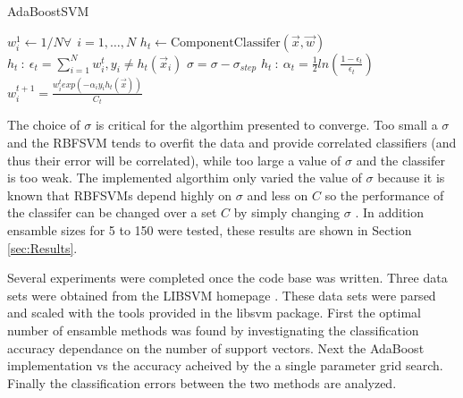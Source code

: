 \begin{algorithm}
\caption{AdaBoostSVM}
\label{algo:AdaBoostSVM}
\begin{algorithmic}[1]
\State $w_{i}^{1} \gets 1/N \forall ~~ i=1,\dots,N$
    \label{marker}
    \State $h_t \gets \text{ComponentClassifer}(\vec{x},\vec{w})$
    \State $h_t~:~\epsilon_t = \sum_{i=1}^{N}w_{i}^{t} , y_i \ne h_t(\vec{x}_i)$
        \State $\sigma = \sigma - \sigma_{step}$
        \State {}
    \EndIf
    \State $h_t~:~\alpha_t = \frac{1}{2} ln\left ( \frac{1-\epsilon_t}{\epsilon_t}\right)$
    \State $w_i^{t+1} = \frac{w_i^{t} exp\left ( -\alpha_i y_i h_t(\vec{x})\right)}{C_t}$
\EndWhile
\Statex
{}
\EndProcedure
\end{algorithmic}
\end{algorithm}

The choice of $\sigma$ is critical for the algorthim presented to converge.
Too small a $\sigma$ and the RBFSVM tends to overfit the data and provide correlated classifiers (and thus their error will be correlated), while too large a value of $\sigma$ and the classifer is too weak.
The implemented algorthim only varied the value of $\sigma$ because it is known that RBFSVMs depend highly on $\sigma$ and less on $C$ so the performance of the classifer can be changed over a set $C$ by simply changing $\sigma$ \cite{li_adaboost_2008}.
In addition ensamble sizes for 5 to 150 were tested, these results are shown in Section \ref{sec:Results}.

Several experiments were completed once the code base was written.
Three data sets were obtained from the LIBSVM homepage \cite{chang_libsvm:_2011}.
These data sets were parsed and scaled with the tools provided in the libsvm package.
First the optimal number of ensamble methods was found by investignating the classification accuracy dependance on the number of support vectors.
Next the AdaBoost implementation vs the accuracy acheived by the a single parameter grid search.
Finally the classification errors between the two methods are analyzed.
